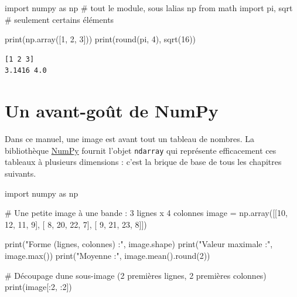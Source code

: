 \documentclass[
  french,
  11pt,
  letterpaper,
  open=any,
  twoside=false,
  french]{scrbook}
\newenvironment{Shaded}{\begin{snugshade}}{\end{snugshade}}
\newcommand{\BuiltInTok}[1]{\textcolor[rgb]{0.00,0.23,0.31}{#1}}
\newcommand{\CommentTok}[1]{\textcolor[rgb]{0.37,0.37,0.37}{#1}}
\newcommand{\DecValTok}[1]{\textcolor[rgb]{0.68,0.00,0.00}{#1}}
\newcommand{\ImportTok}[1]{\textcolor[rgb]{0.00,0.46,0.62}{#1}}
\newcommand{\NormalTok}[1]{\textcolor[rgb]{0.00,0.23,0.31}{#1}}
\newcommand{\OperatorTok}[1]{\textcolor[rgb]{0.37,0.37,0.37}{#1}}
\newcommand{\StringTok}[1]{\textcolor[rgb]{0.13,0.47,0.30}{#1}}
\begin{document}
\begin{Shaded}
\begin{Highlighting}[]
\ImportTok{import}\NormalTok{ numpy }\ImportTok{as}\NormalTok{ np              }\CommentTok{\# tout le module, sous l\textquotesingle{}alias np}
\ImportTok{from}\NormalTok{ math }\ImportTok{import}\NormalTok{ pi, sqrt       }\CommentTok{\# seulement certains éléments}

\BuiltInTok{print}\NormalTok{(np.array([}\DecValTok{1}\NormalTok{, }\DecValTok{2}\NormalTok{, }\DecValTok{3}\NormalTok{]))}
\BuiltInTok{print}\NormalTok{(}\BuiltInTok{round}\NormalTok{(pi, }\DecValTok{4}\NormalTok{), sqrt(}\DecValTok{16}\NormalTok{))}
\end{Highlighting}
\end{Shaded}

\begin{verbatim}
[1 2 3]
3.1416 4.0
\end{verbatim}

\section{Un avant-goût de NumPy}\label{sec-00-02}

Dans ce manuel, une image est avant tout un tableau de nombres. La
bibliothèque \href{https://numpy.org/}{NumPy} fournit l'objet
\texttt{ndarray} qui représente efficacement ces tableaux à plusieurs
dimensions : c'est la brique de base de tous les chapitres suivants.

\begin{Shaded}
\begin{Highlighting}[]
\ImportTok{import}\NormalTok{ numpy }\ImportTok{as}\NormalTok{ np}

\CommentTok{\# Une petite image à une bande : 3 lignes x 4 colonnes}
\NormalTok{image }\OperatorTok{=}\NormalTok{ np.array([[}\DecValTok{10}\NormalTok{, }\DecValTok{12}\NormalTok{, }\DecValTok{11}\NormalTok{,  }\DecValTok{9}\NormalTok{],}
\NormalTok{                  [ }\DecValTok{8}\NormalTok{, }\DecValTok{20}\NormalTok{, }\DecValTok{22}\NormalTok{,  }\DecValTok{7}\NormalTok{],}
\NormalTok{                  [ }\DecValTok{9}\NormalTok{, }\DecValTok{21}\NormalTok{, }\DecValTok{23}\NormalTok{,  }\DecValTok{8}\NormalTok{]])}

\BuiltInTok{print}\NormalTok{(}\StringTok{"Forme (lignes, colonnes) :"}\NormalTok{, image.shape)}
\BuiltInTok{print}\NormalTok{(}\StringTok{"Valeur maximale :"}\NormalTok{, image.}\BuiltInTok{max}\NormalTok{())}
\BuiltInTok{print}\NormalTok{(}\StringTok{"Moyenne :"}\NormalTok{, image.mean().}\BuiltInTok{round}\NormalTok{(}\DecValTok{2}\NormalTok{))}

\CommentTok{\# Découpage d\textquotesingle{}une sous{-}image (2 premières lignes, 2 premières colonnes)}
\BuiltInTok{print}\NormalTok{(image[:}\DecValTok{2}\NormalTok{, :}\DecValTok{2}\NormalTok{])}
\end{Highlighting}
\end{Shaded}
\end{document}
